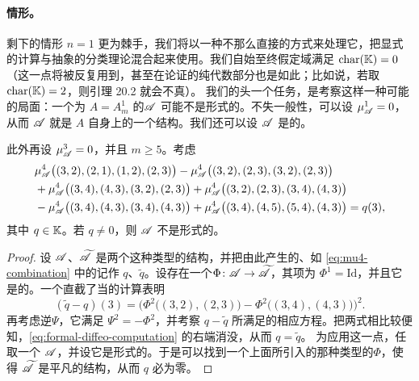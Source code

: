 \paragraph{\trSurface{}情形。}\label{sub:surface-case}
剩下的情形 $n=1$ 更为棘手，我们将以一种不那么直接的方式来处理它，把显式的计算与抽象的分类理论混合起来使用。我们自始至终假定\trCoefficients{}域满足 $\mathrm{char}(\mathbb{K})=0$（这一点将被反复用到，甚至在论证的纯代数部分也是如此；比如说，若取 $\mathrm{char}(\mathbb{K})=2$，则引理 20.2 就会不真）。
我们的头一个任务，是考察这样一种可能的局面：一个\trCohomology{}为 $A=A^1_m$ 的\trACategory{}$\mathscr{A}$ 可能不是形式的。不失一般性，可以设 $\mu^1_{\mathscr{A}}=0$，从而 $\mathscr{A}$ 就是 $A$ 自身上的一个\trAinfty{}结构。我们还可以设 $\mathscr{A}$ 是\trStrictlyUnital{}的。
\begin{lemma}\label{thm:surface-nonformality-lemma}
此外再设 $\mu^3_{\mathscr{A}}=0$，并且 $m\ge 5$。考虑
\begin{equation}\label{eq:mu4-combination}
\begin{split}
&\mu^4_{\mathscr{A}}\bigl((3,2),(2,1),(1,2),(2,3)\bigr)-\mu^4_{\mathscr{A}}\bigl((3,2),(2,3),(3,2),(2,3)\bigr)\\
&+\mu^4_{\mathscr{A}}\bigl((3,4),(4,3),(3,2),(2,3)\bigr)+\mu^4_{\mathscr{A}}\bigl((3,2),(2,3),(3,4),(4,3)\bigr)\\
&-\mu^4_{\mathscr{A}}\bigl((3,4),(4,3),(3,4),(4,3)\bigr)+\mu^4_{\mathscr{A}}\bigl((3,4),(4,5),(5,4),(4,3)\bigr)=q(3),
\end{split}
\end{equation}
其中 $q\in\mathbb{K}$。若 $q\ne 0$，则 $\mathscr{A}$ 不是形式的。
\end{lemma}
\begin{proof}
设 $\mathscr{A}$、$\widetilde{\mathscr{A}}$ 是两个这种类型的\trAinfty{}结构，并把由此产生的、如 \eqref{eq:mu4-combination} 中的\trCoefficients{}记作 $q$、$\tilde{q}$。设存在一个\trFormalDiffeomorphism{}$\Phi\colon\mathscr{A}\to\widetilde{\mathscr{A}}$，其\trLinear{}项为 $\Phi^1=\mathrm{Id}$，并且它是\trStrictlyUnital{}的。一个直截了当的计算表明
\begin{equation}\label{eq:formal-diffeo-computation}
(\tilde{q}-q)(3)=\bigl(\Phi^2\bigl((3,2),(2,3)\bigr)-\Phi^2\bigl((3,4),(4,3)\bigr)\bigr)^2.
\end{equation}
再考虑逆\trFormalDiffeomorphism{}$\Psi$，它满足 $\Psi^2=-\Phi^2$，并考察 $q-\tilde{q}$ 所满足的相应方程。把两式相比较便知，\eqref{eq:formal-diffeo-computation} 的右端消没，从而 $q=\tilde{q}$。
为应用这一点，任取一个 $\mathscr{A}$，并设它是形式的。于是可以找到一个上面所引入的那种类型的\trFormalDiffeomorphism{}$\Phi$，使得 $\widetilde{\mathscr{A}}$ 是平凡的\trAinfty{}结构，从而 $q$ 必为零。
\end{proof}
